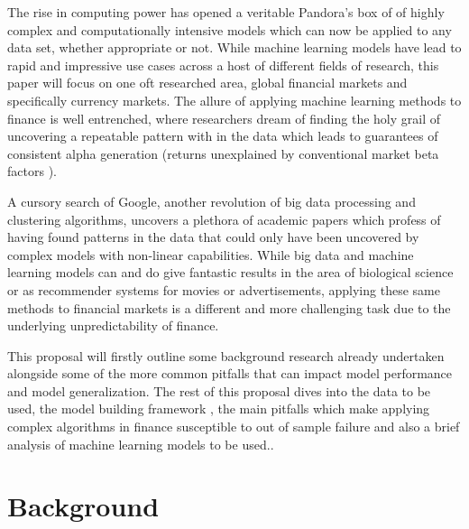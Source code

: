 \documentclass[12pt, a4paper]{article}
\begin{document}
\par
The rise in computing power has opened a veritable Pandora's box of of highly complex and computationally intensive models which can now be applied to any data set, whether appropriate or not. While machine learning models have lead to rapid and impressive use cases across a host of different fields of research, this paper will focus on one oft researched area, global financial markets and specifically currency markets.
The allure of applying machine learning methods to finance is well entrenched, where researchers dream of finding the holy grail of uncovering a repeatable pattern with in the data which leads to guarantees of consistent alpha generation (returns unexplained by conventional market beta factors \cite{Rebonato2017}).
\par 
A cursory search of Google, another revolution of big data processing and clustering algorithms, uncovers a plethora of academic papers which profess of having found patterns in the data that could only have been uncovered by complex models with non-linear capabilities. While big data and machine learning models can and do give fantastic results in the area of biological science or as recommender systems for movies or advertisements, applying these same methods to financial markets is a different and more challenging task due to the underlying unpredictability of finance.\par

This proposal will firstly outline some background research already undertaken alongside some of the more common pitfalls that can impact model performance and model generalization.  The rest of this proposal dives into the data to be used, the model building framework , the main pitfalls which make applying complex algorithms in finance susceptible to out of sample failure \cite{LopezdePrado2018} and also a brief analysis of machine learning models to be used.\cite{backtesting}.
\par

\section{Background}
\end{document}
